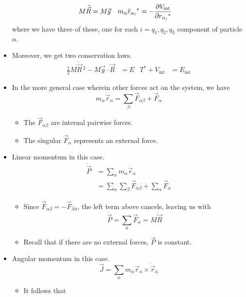 \documentclass[../notes.tex]{subfiles}
\begin{document}
\begin{itemize}
\begin{align*}
        M\ddot{\vec{R}} &= M\vec{g}&
        m_\alpha\ddot{r}_{\alpha_i}{}^* &= -\pdv{V_\text{int}}{r_{\alpha_i}{}^*}
    \end{align*}
    where we have three of these, one for each $i=q_1,q_2,q_3$ component of particle $\alpha$.
    \item Moreover, we get two conservation laws.
    \begin{align*}
        \frac{1}{2}M\dot{\vec{R}}{\,}^2-M\vec{g}\cdot\vec{R} &= E&
        T^*+V_\text{int} &= E_\text{int}
    \end{align*}
    \item In the more general case wherein other forces act on the system, we have
    \begin{equation*}
        m_\alpha\ddot{\vec{r}}_\alpha = \sum_\beta\vec{F}_{\alpha\beta}+\vec{F}_\alpha
    \end{equation*}
    \begin{itemize}
        \item The $\vec{F}_{\alpha\beta}$ are internal pairwise forces.
        \item The singular $\vec{F}_\alpha$ represents an external force.
    \end{itemize}
    \item Linear momentum in this case.
    \begin{align*}
        \dot{\vec{P}} &= \sum_\alpha m_\alpha\ddot{\vec{r}}_\alpha\\
        &= \sum_\alpha\sum_\beta\vec{F}_{\alpha\beta}+\sum_\alpha\vec{F}_\alpha
    \end{align*}
    \begin{itemize}
        \item Since $\vec{F}_{\alpha\beta}=-\vec{F}_{\beta\alpha}$, the left term above cancels, leaving us with
        \begin{equation*}
            \dot{\vec{P}} = \sum_\alpha\vec{F}_\alpha
            = M\ddot{\vec{R}}
        \end{equation*}
        \item Recall that if there are no external forces, $\vec{P}$ is constant.
    \end{itemize}
    \item Angular momentum in this case.
    \begin{equation*}
        \vec{J} = \sum_\alpha m_\alpha\vec{r}_\alpha\times\dot{\vec{r}}_\alpha
    \end{equation*}
    \begin{itemize}
        \item It follows that

\end{itemize}
\end{itemize}
\end{document}
